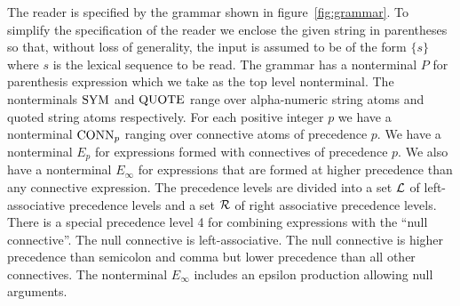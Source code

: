 \documentclass{article}
\begin{document}
The reader is specified by the grammar shown in figure~\ref{fig:grammar}.
To simplify the specification of the reader we enclose the given string in parentheses so that, without loss of generality, the input is assumed to be of the form
$\{s\}$ where $s$ is the lexical sequence to be read.  The grammar has a nonterminal $P$ for parenthesis expression which we take as the top level nonterminal.
The nonterminals $\mathrm{SYM}$ and $\mathrm{QUOTE}$ range over alpha-numeric string atoms and quoted string atoms respectively.
For each positive integer $p$ we have a nonterminal $\mathrm{CONN}_p$ ranging over connective atoms of precedence $p$.
We have a nonterminal $E_p$ for expressions formed with connectives
of precedence $p$.  We also have a nonterminal $E_\infty$ for expressions that are formed at higher precedence than any connective expression.
The precedence levels are divided into a set ${\cal L}$ of left-associative precedence levels and a set ${\cal R}$ of right associative precedence levels.
There is a special precedence level 4 for combining expressions with the ``null connective''. The null connective is left-associative.
The null connective is higher precedence than semicolon and comma but lower precedence than all other connectives.
The nonterminal $E_\infty$ includes an epsilon production allowing null arguments.
\end{document}
